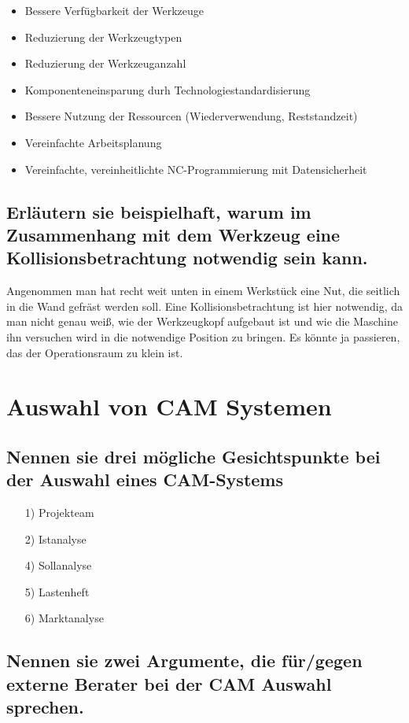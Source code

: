 \begin{itemize}
    \item Bessere Verfügbarkeit der Werkzeuge
    \item Reduzierung der Werkzeugtypen
    \item Reduzierung der Werkzeuganzahl
    \item Komponenteneinsparung durh Technologiestandardisierung
    \item Bessere Nutzung der Ressourcen (Wiederverwendung, Reststandzeit)
    \item Vereinfachte Arbeitsplanung
    \item Vereinfachte, vereinheitlichte NC-Programmierung mit Datensicherheit
\end{itemize}

\subsection*{%
    Erläutern sie beispielhaft, warum im Zusammenhang mit dem Werkzeug eine
    Kollisionsbetrachtung notwendig sein kann.
}

Angenommen man hat recht weit unten in einem Werkstück eine Nut, die seitlich
in die Wand gefräst werden soll. Eine Kollisionsbetrachtung ist hier notwendig,
da man nicht genau weiß, wie der Werkzeugkopf aufgebaut ist und wie die
Maschine ihn versuchen wird in die notwendige Position zu bringen. Es könnte ja
passieren, das der Operationsraum zu klein ist.


\newpage


\section{Auswahl von CAM Systemen}


\subsection*{Nennen sie drei mögliche Gesichtspunkte bei der Auswahl eines CAM-Systems}


\begin{itemize}
\item[1)] Projekteam
\item[2)] Istanalyse
\item[4)] Sollanalyse
\item[5)] Lastenheft
\item[6)] Marktanalyse
\end{itemize}


\subsection*{Nennen sie zwei Argumente, die für/gegen externe Berater bei der CAM Auswahl sprechen.}


